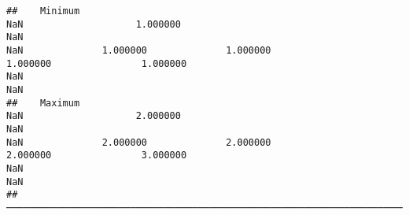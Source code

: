 \documentclass[
]{article}
\begin{document}
\begin{verbatim}
##    Minimum                                                                  NaN                    1.000000                                                                  NaN                                                                  NaN              1.000000              1.000000                1.000000                1.000000                                                                  NaN                                                                  NaN   
##    Maximum                                                                  NaN                    2.000000                                                                  NaN                                                                  NaN              2.000000              2.000000                2.000000                3.000000                                                                  NaN                                                                  NaN   
##  ────────────────────────────────────────────────────────────────────────────────────────────────────────────────────────────────────────────────────────────────────────────────────────────────────────────────────────────────────────────────────────────────────────────────────────────────────────────────────────────────────────────────────────────────────────────────────────────────────────────────────────────────────────────────────────────────────────────────────────────
\end{verbatim}
\end{document}
